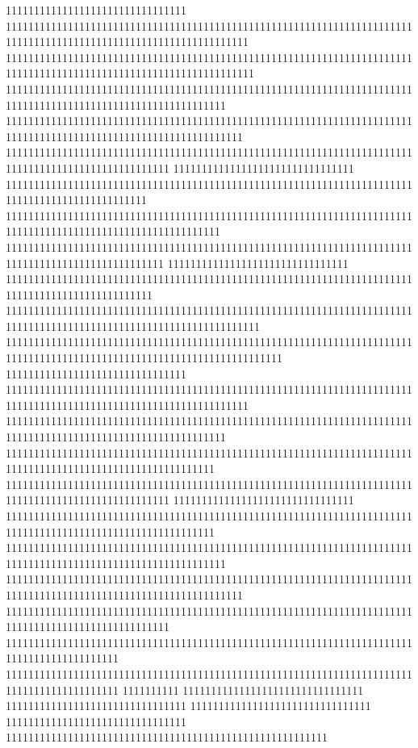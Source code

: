 11111111111111111111111111111111
1111111111111111111111111111111111111111111111111111111111111111111111111111111111111111111111111111111111111111111
11111111111111111111111111111111111111111111111111111111111111111111111111111111111111111111111111111111111111111111
111111111111111111111111111111111111111111111111111111111111111111111111111111111111111111111111111111111111111
111111111111111111111111111111111111111111111111111111111111111111111111111111111111111111111111111111111111111111
11111111111111111111111111111111111111111111111111111111111111111111111111111111111111111111111111111
11111111111111111111111111111111
1111111111111111111111111111111111111111111111111111111111111111111111111111111111111111111111111
11111111111111111111111111111111111111111111111111111111111111111111111111111111111111111111111111111111111111
1111111111111111111111111111111111111111111111111111111111111111111111111111111111111111111111111111
11111111111111111111111111111111
11111111111111111111111111111111111111111111111111111111111111111111111111111111111111111111111111
111111111111111111111111111111111111111111111111111111111111111111111111111111111111111111111111111111111111111111111
1111111111111111111111111111111111111111111111111111111111111111111111111111111111111111111111111111111111111111111111111
11111111111111111111111111111111
1111111111111111111111111111111111111111111111111111111111111111111111111111111111111111111111111111111111111111111
111111111111111111111111111111111111111111111111111111111111111111111111111111111111111111111111111111111111111
1111111111111111111111111111111111111111111111111111111111111111111111111111111111111111111111111111111111111
11111111111111111111111111111111111111111111111111111111111111111111111111111111111111111111111111111
11111111111111111111111111111111
1111111111111111111111111111111111111111111111111111111111111111111111111111111111111111111111111111111111111
111111111111111111111111111111111111111111111111111111111111111111111111111111111111111111111111111111111111111
111111111111111111111111111111111111111111111111111111111111111111111111111111111111111111111111111111111111111111
11111111111111111111111111111111111111111111111111111111111111111111111111111111111111111111111111111
11111111111111111111111111111111111111111111111111111111111111111111111111111111111111111111
11111111111111111111111111111111111111111111111111111111111111111111111111111111111111111111
1111111111
11111111111111111111111111111111
11111111111111111111111111111111
11111111111111111111111111111111
11111111111111111111111111111111
111111111111111111111111111111111111111111111111111111111
